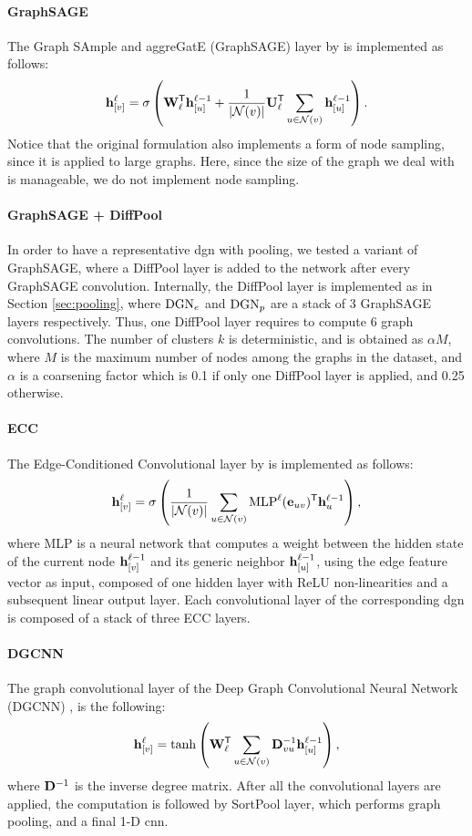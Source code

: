\paragraph{GraphSAGE}
The Graph SAmple and aggreGatE (GraphSAGE) layer by \cite{hamilton2017graphsage} is implemented as follows:
$$\Elem{h}{v}^{\ell} = \sigma\Paren{\Matrix{W}^{\Transpose}_{\ell}\Elem{h}{u}^{\ell-1} + \frac{1}{|\Cal{N}(v)|} \Matrix{U}^{\Transpose}_{\ell} \sum_{u \in \Cal{N}(v)} \Elem{h}{u}^{\ell-1}}.$$
Notice that the original formulation also implements a form of node sampling, since it is applied to large graphs. Here, since the size of the graph we deal with is manageable, we do not implement node sampling.

\paragraph{GraphSAGE + DiffPool}
In order to have a representative \gls{dgn} with pooling, we tested a variant of GraphSAGE, where a DiffPool layer is added to the network after every GraphSAGE convolution. Internally, the DiffPool layer is implemented as in Section \ref{sec:pooling}, where $\mathrm{DGN}_e$ and $\mathrm{DGN}_p$ are a stack of 3 GraphSAGE layers respectively. Thus, one DiffPool layer requires to compute 6 graph convolutions. The number of clusters $k$ is deterministic, and is obtained as $\alpha M$, where $M$ is the maximum number of nodes among the graphs in the dataset, and $\alpha$ is a coarsening factor which is 0.1 if only one DiffPool layer is applied, and 0.25 otherwise.

\paragraph{ECC}
The Edge-Conditioned Convolutional layer by \cite{simonovsky2017ecc} is implemented as follows:
$$\Elem{h}{v}^{\ell} = \sigma\Paren{ \frac{1}{|\Cal{N}(v)|}\sum_{u \in \Cal{N}(v)} \Fun{MLP}^{\ell}(\Vector{e}_{uv})^{\Transpose} \mathbf{h}_u^{\ell-1}},$$
where MLP is a neural network that computes a weight between the hidden state of the current node $\Elem{h}{v}^{\ell-1}$ and its generic neighbor $\Elem{h}{u}^{\ell-1}$, using the edge feature vector as input, composed of one hidden layer with ReLU non-linearities and a subsequent linear output layer. Each convolutional layer of the corresponding \gls{dgn} is composed of a stack of three ECC layers.

\paragraph{DGCNN}
The graph convolutional layer of the Deep Graph Convolutional Neural Network (DGCNN) \citep{zhang2018dgcnn}, is the following:
$$\Elem{h}{v}^{\ell} = \Fun{tanh} \Paren{\Matrix{W}_{\ell}^{\Transpose} \sum_{u \in \mathcal{N}(v)} \Matrix{D}^{-1}_{vu}\Elem{h}{u}^{\ell-1}},$$
where $\Matrix{D}^{-1}$ is the inverse degree matrix. After all the convolutional layers are applied, the computation is followed by SortPool layer, which performs graph pooling, and a final 1-D \gls{cnn}.

